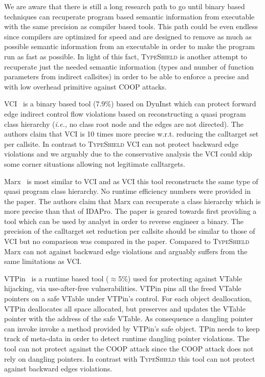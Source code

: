 We are aware that there is still a long research path to go until binary based techniques can 
recuperate program based semantic information from executable with the same precision as compiler based tools.
This path could be even endless since compilers are optimized for speed and are designed to remove as much as possible semantic information
from an executable in order to make the program run as fast as possible. In light of this fact,
\textsc{TypeShield} is another attempt to recuperate just the needed semantic information (types and number of function parameters from
indirect callsites) in order to be able to enforce a precise and with low overhead primitive against COOP attacks.

VCI~\cite{vci:asiaccs} is a binary based tool (7.9\%) based on DynInst which can protect forward edge indirect control flow violations based 
on reconstructing a quasi program class hierarchy (\textit{i.e.,} no class root node and the edges are not directed). The authors claim that 
VCI is 10 times more precise w.r.t. reducing the calltarget set per callsite. In contrast to \textsc{TypeShield} VCI can not 
protect backward edge violations and we arguably due to the conservative analysis the VCI could skip some corner situations 
allowing not legitimate calltargets.

Marx~\cite{marx} is most similar to VCI and as VCI this tool reconstructs the same type of quasi program class hierarchy. 
No runtime efficiency numbers were provided in the paper.
The authors claim that Marx can recuperate a class hierarchy which is more precise than that of IDAPro. The paper is geared towards
first providing a tool which can be used by analyst in order to reverse engineer a binary. The precision of the calltarget set reduction
per callsite should be similar to those of VCI but no comparison was compared in the paper. Compared to \textsc{TypeShield} 
Marx can not against backward edge violations and arguably suffers from the same limitations as VCI.

VTPin~\cite{vtpin} is a runtime based tool ($\approx$5\%) used for protecting against VTable hijacking, via use-after-free vulnerabilities. VTPin pins
all the freed VTable pointers on a safe VTable under VTPin’s control. For each object deallocation, VTPin deallocates all space allocated, but preserves and updates
the VTable pointer with the address of the safe VTable. As consequence a dangling pointer can invoke 
invoke a method provided by VTPin’s safe object. TPin needs to keep track of meta-data in order to detect runtime 
dangling pointer violations. The tool can not protect against the COOP attack since the COOP attack does not rely on dangling pointers.
In contrast with \textsc{TypeShield} this tool can not protect against backward edges violations.

